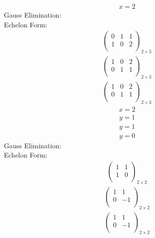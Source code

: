 \documentclass{article}
\begin{document}
\begin{align*}
x=2\end{align*}
Gauss Elimination:\\
Echelon Form:\\
\begin{align*}
\left(
\begin{array}{cc|c}
0 & 1 & 1\\
1 & 0 & 2\\
\end{array}
\right)_{2\times 3}
\end{align*}
\begin{align*}
\left(
\begin{array}{cc|c}
1 & 0 & 2\\
0 & 1 & 1\\
\end{array}
\right)_{2\times 3}
\end{align*}
\begin{align*}
\left(
\begin{array}{cc|c}
1 & 0 & 2\\
0 & 1 & 1\\
\end{array}
\right)_{2\times 3}
\end{align*}
\begin{align*}
x=2\end{align*}
\begin{align*}
y=1\end{align*}
\begin{align*}
y=1\end{align*}
\begin{align*}
y=0\end{align*}
Gauss Elimination:\\
Echelon Form:\\
\begin{align*}
\left(
\begin{array}{c|c}
1 & 1\\
1 & 0\\
\end{array}
\right)_{2\times 2}
\end{align*}
\begin{align*}
\left(
\begin{array}{c|c}
1 & 1\\
0 & -1\\
\end{array}
\right)_{2\times 2}
\end{align*}
\begin{align*}
\left(
\begin{array}{c|c}
1 & 1\\
0 & -1\\
\end{array}
\right)_{2\times 2}
\end{align*}
\end{document}

